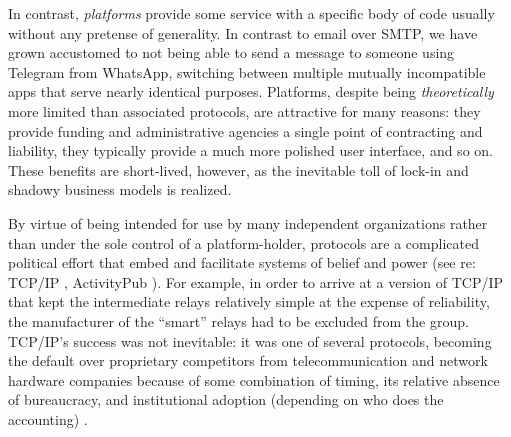 In contrast, \emph{platforms} provide some service with a specific body
of code usually without any pretense of generality. In contrast to email
over SMTP, we have grown accustomed to not being able to send a message
to someone using Telegram from WhatsApp, switching between multiple
mutually incompatible apps that serve nearly identical purposes.
Platforms, despite being \emph{theoretically} more limited than
associated protocols, are attractive for many reasons: they provide
funding and administrative agencies a single point of contracting and
liability, they typically provide a much more polished user interface,
and so on. These benefits are short-lived, however, as the inevitable
toll of lock-in and shadowy business models is realized.

By virtue of being intended for use by many independent organizations
rather than under the sole control of a platform-holder, protocols are a
complicated political effort that embed and facilitate systems of belief
and power (see re: TCP/IP \citep{larsenPoliticalNatureTCP2012} ,
ActivityPub \citep{lemmer-webberStandardsDivisionsCollaboration2018} ). For example, in order to arrive at a version of TCP/IP that kept
the intermediate relays relatively simple at the expense of reliability,
the manufacturer of the ``smart'' relays had to be excluded from the
group. TCP/IP's success was not inevitable: it was one of several
protocols, becoming the default over proprietary competitors from
telecommunication and network hardware companies because of some
combination of timing, its relative absence of bureaucracy, and
institutional adoption (depending on who does the accounting)\citep{larsenPoliticalNatureTCP2012} .

